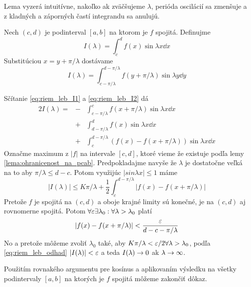 \begin{dokaz}
    Lema vyzerá intuitívne, nakoľko ak zväčšujeme $\lambda$,
    perióda oscilácií sa zmenšuje a 
    z kladných a záporných častí integrandu sa anulujú.

    \def\pil{\pi/\lambda}

    Nech $(c,d)$ je podinterval $[a,b]$ na ktorom je $f$ spojitá.
    Definujme 
    \begin{equation}
        I(\lambda) = \int_c^d f(x) \sin \lambda x \dd x
        \label{eq:riem_leb_I1}
    \end{equation}
    Substitúciou $x=y+\pil$ dostávame
    \begin{equation}
        I(\lambda) = \int_{c-\pil}^{d-\pil}
            f \left(y+\pil\right) \sin \lambda y \dd y
        \label{eq:riem_leb_I2}
    \end{equation}

    Sčítanie \ref{eq:riem_leb_I1} a \ref{eq:riem_leb_I2} dá
    \begin{eqnarray}
        2I(\lambda) =&-&\int_{c-\pil}^c f(x+\pil) \sin \lambda x \dd x 
                \\ &+&
                \int_{d-\pil}^d f(x) \sin \lambda x \dd x \\&+&
                \int_c^{d-\pil} \left( 
                    f(x) - f(x+\pil)
                    \right) \sin \lambda x \dd x
    \end{eqnarray}
    Označme maximum z $|f|$ na intervale $[c,d]$, ktoré vieme že
    existuje podľa lemy \ref{lema:ohranicenost_na_pcab}.
    Predpokladajme navyše že $\lambda$ je dostatočne veľká na to aby
    $\pil \le d-c$. Potom využijúc $|sin \lambda x|\le1$ máme
    \begin{equation}
        |I(\lambda)| \le K \pil + \frac{1}{2} \int_c^{d-\pil}
            \left|f(x) - f(x+\pil)\right|
        \label{eq:riem_leb_odhad}
    \end{equation}
    Pretože $f$ je spojitá na $(c,d)$ a oboje krajné limity sú konečné,
    je na $(c,d)$ aj rovnomerne spojitá. 
    Potom $\forall \varepsilon \exists \lambda_0: \forall \lambda>\lambda_0$
    platí
    \begin{equation}
        |f(x) - f(x+\pil)| < \frac{\eps}{d-c-\pil}
    \end{equation}
    No a pretože môžeme zvoliť $\lambda_0$ také, aby $K \pil < \eps/2
    \forall \lambda>\lambda_0$, podľa \ref{eq:riem_leb_odhad}
    $|I(\lambda)|<\varepsilon$ a teda $I(\lambda)\rightarrow0$ ak
    $\lambda\rightarrow\infty$.
    
    Použitím rovnakého argumentu pre kosínus a aplikovaním výsledku 
    na všetky podintervaly $[a,b]$ na ktorých je $f$ spojitá môžeme
    zakončiť dôkaz.
\end{dokaz}

